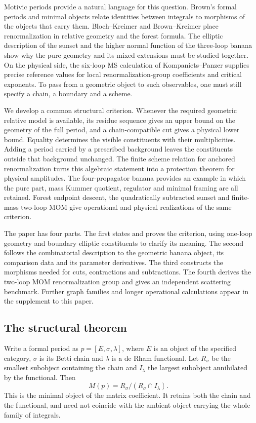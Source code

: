\documentclass[11pt,a4paper,oneside]{article}
\theoremstyle{plain}
\theoremstyle{definition}
\theoremstyle{remark}
\numberwithin{equation}{section}
\begin{document}
Motivic periods provide a natural language for this question. Brown's formal periods and minimal objects relate identities between integrals to morphisms of the objects that carry them\cite{brownperiods,browncosmic}. Bloch--Kreimer and Brown--Kreimer place renormalization in relative geometry and the forest formula\cite{bk2008,bk2011,bk2012}. The elliptic description of the sunset and the higher normal function of the three-loop banana show why the pure geometry and its mixed extensions must be studied together\cite{bv,bkv}. On the physical side, the six-loop MS calculation of Kompaniets--Panzer supplies precise reference values for local renormalization-group coefficients and critical exponents\cite{kp}. To pass from a geometric object to such observables, one must still specify a chain, a boundary and a scheme.

We develop a common structural criterion. Whenever the required geometric relative model is available, its residue sequence gives an upper bound on the geometry of the full period, and a chain-compatible cut gives a physical lower bound. Equality determines the visible constituents with their multiplicities. Adding a period carried by a prescribed background leaves the constituents outside that background unchanged. The finite scheme relation for anchored renormalization turns this algebraic statement into a protection theorem for physical amplitudes. The four-propagator banana provides an example in which the pure part, mass Kummer quotient, regulator and minimal framing are all retained. Forest endpoint descent, the quadratically subtracted sunset and finite-mass two-loop MOM give operational and physical realizations of the same criterion.

The paper has four parts. The first states and proves the criterion, using one-loop geometry and boundary elliptic constituents to clarify its meaning. The second follows the combinatorial description to the geometric banana object, its comparison data and its parameter derivatives. The third constructs the morphisms needed for cuts, contractions and subtractions. The fourth derives the two-loop MOM renormalization group and gives an independent scattering benchmark. Further graph families and longer operational calculations appear in the supplement to this paper.

\subsection{The structural theorem}
Write a formal period as $p=[E,\sigma,\lambda]$, where $E$ is an object of the specified category, $\sigma$ is its Betti chain and $\lambda$ is a de Rham functional. Let $R_\sigma$ be the smallest subobject containing the chain and $I_\lambda$ the largest subobject annihilated by the functional. Then
\[
 M(p)=R_\sigma/(R_\sigma\cap I_\lambda).
\]
This is the minimal object of the matrix coefficient. It retains both the chain and the functional, and need not coincide with the ambient object carrying the whole family of integrals.
\end{document}
